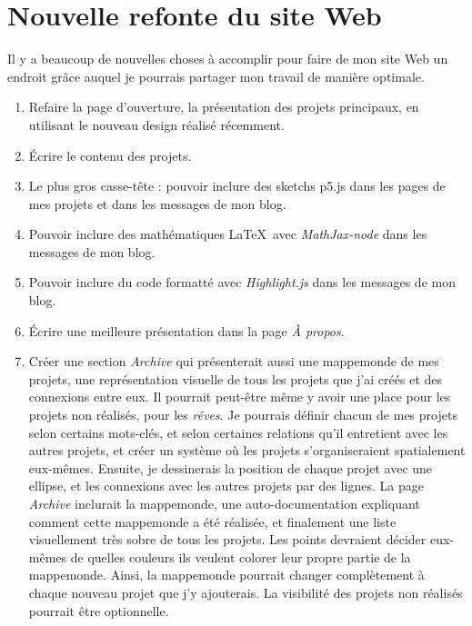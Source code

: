 
\newpage
\section{Nouvelle refonte du site Web}

Il y a beaucoup de nouvelles choses à accomplir pour faire de mon site Web un endroit grâce auquel je pourrais partager mon travail de manière optimale.

\begin{enumerate}  
\item Refaire la page d'ouverture, la présentation des projets principaux, en utilisant le nouveau design réalisé récemment.
\item Écrire le contenu des projets.
\item Le plus gros casse-tête : pouvoir inclure des sketchs p5.js dans les pages de mes projets et dans les messages de mon blog.
\item Pouvoir inclure des mathématiques \LaTeX\ avec \textit{MathJax-node} dans les messages de mon blog.
\item Pouvoir inclure du code formatté avec \textit{Highlight.js} dans les messages de mon blog.
\item Écrire une meilleure présentation dans la page \textit{À propos}.
\item Créer une section \textit{Archive} qui présenterait aussi une mappemonde de mes projets, une représentation visuelle de tous les projets que j'ai créés et des connexions entre eux. Il pourrait peut-être même y avoir une place pour les projets non réalisés, pour les \textit{rêves}. Je pourrais définir chacun de mes projets selon certains mots-clés, et selon certaines relations qu'il entretient avec les autres projets, et créer un système où les projets s'organiseraient spatialement eux-mêmes. Ensuite, je dessinerais la position de chaque projet avec une ellipse, et les connexions avec les autres projets par des lignes. La page \textit{Archive} inclurait la mappemonde, une auto-documentation expliquant comment cette mappemonde a été réalisée, et finalement une liste visuellement très sobre de tous les projets. Les points devraient décider eux-mêmes de quelles couleurs ils veulent colorer leur propre partie de la mappemonde. Ainsi, la mappemonde pourrait changer complètement à chaque nouveau projet que j'y ajouterais. La visibilité des projets non réalisés pourrait être optionnelle.
\end{enumerate}